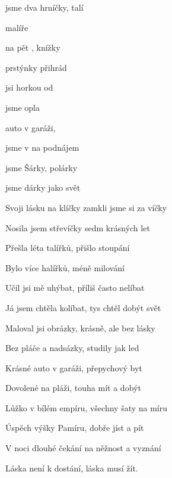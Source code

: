 

\zs
{} jsme dva hrníčky,  talí

   malíře

 na pět ,  {knížky} 

 prstýnky   přihrád

\bigskip

 jsi   horkou od 

 jsme   opla 
\ks


\zr
{} auto v garáži,   

 jsme v   na podnájem

 jsme  Šárky,  polárky

 jsme  dárky  jako svět

\bigskip

Svoji lásku na klíčky zamkli jsme si za víčky

Nosila jsem střevíčky sedm krásných let
\kr


\zs
Přešla léta talířků, přišlo stoupání

Bylo více halířků, méně milování

Učil jsi mě uhýbat, příliš často nelíbat

Já jsem chtěla kolíbat, tys chtěl dobýt svět

\bigskip

Maloval jsi obrázky, krásně, ale bez lásky

Bez pláče a nadsázky, studily jak led
\ks

\zr
Krásné auto v garáži, přepychový byt

Dovolené na pláži, touha mít a dobýt

Lůžko v bílém empíru, všechny šaty na míru

Úspěch výšky Pamíru, dobře jíst a pít

\bigskip

V noci dlouhé čekání na něžnost a vyznání

Láska není k dostání, láska musí žít.
\kr

